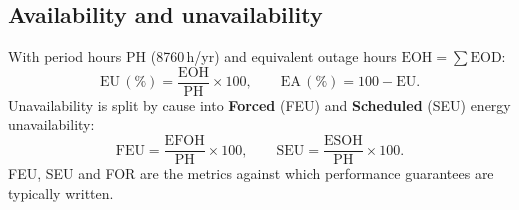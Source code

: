 \subsection{Availability and unavailability}
With period hours $\mathrm{PH}$ (8760\,h/yr) and equivalent outage hours
$\mathrm{EOH}=\sum\mathrm{EOD}$:
\[
  \mathrm{EU}\,(\%) = \frac{\mathrm{EOH}}{\mathrm{PH}}\times 100,
  \qquad
  \mathrm{EA}\,(\%) = 100 - \mathrm{EU}.
\]
Unavailability is split by cause into \textbf{Forced} (FEU) and \textbf{Scheduled}
(SEU) energy unavailability:
\[
  \mathrm{FEU}=\frac{\mathrm{EFOH}}{\mathrm{PH}}\times 100,
  \qquad
  \mathrm{SEU}=\frac{\mathrm{ESOH}}{\mathrm{PH}}\times 100.
\]
FEU, SEU and FOR are the metrics against which performance guarantees are
typically written.
